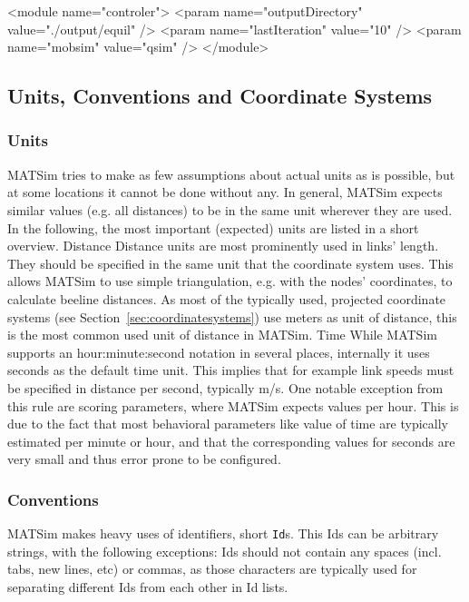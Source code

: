 \begin{xml}
<module name="controler">
	<param name="outputDirectory" value="./output/equil" />
	<param name="lastIteration" value="10" />
	<param name="mobsim" value="qsim" />	
</module>
\end{xml}

\subsection{Units, Conventions and Coordinate Systems}
\label{sec:unitsconventions}
\subsubsection{Units}
MATSim tries to make as few assumptions about actual units as is possible, but at some locations it cannot be done without any. In general, MATSim expects similar values (e.g. all distances) to be in the same unit wherever they are used. In the following, the most important (expected) units are listed in a short overview. Distance  Distance units are most prominently used in links' length. They should be specified in the same unit that the coordinate system uses. This allows MATSim to use simple triangulation, e.g. with the nodes' coordinates, to calculate beeline distances. As most of the typically used, projected coordinate systems (see Section~\ref{sec:coordinatesystems}) use meters as unit of distance, this is the most common used unit of distance in MATSim. Time  While MATSim supports an hour:minute:second notation in several places, internally it uses seconds as the default time unit. This implies that for example link speeds must be specified in distance per second, typically m/s. One notable exception from this rule are scoring parameters, where MATSim expects values per hour. This is due to the fact that most behavioral parameters like value of time are typically estimated per minute or hour, and that the corresponding values for seconds are very small and thus error prone to be configured. 

\subsubsection{Conventions}
MATSim makes heavy uses of identifiers, short \lstinline|Id|s. This Ids can be arbitrary strings, with the following exceptions: Ids should not contain any spaces (incl. tabs, new lines, etc) or commas, as those characters are typically used for separating different Ids from each other in Id lists. 

